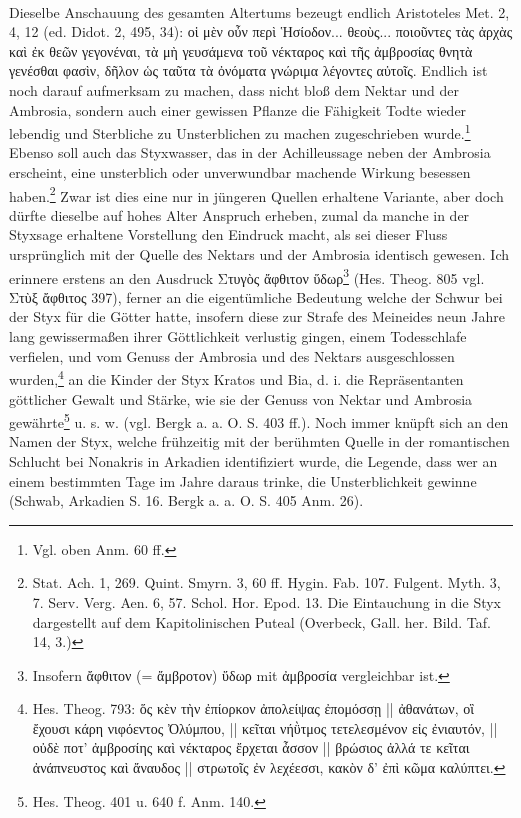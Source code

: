 \documentclass[a4paper, 11pt, oneside]{article}
\begin{document}
\paragraph{}
Dieselbe Anschauung des gesamten Altertums bezeugt endlich Aristoteles Met. 2, 4, 12 (ed. Didot. 2, 495, 34): οἱ μὲν οὖν περὶ Ἡσίοδον... θεοὺς... ποιοῦντες τὰς ἀρχὰς καὶ ἐκ θεῶν γεγονέναι, τὰ μὴ γευσάμενα τοῦ νέκταρος καὶ τῆς ἀμβροσίας θνητὰ γενέσθαι φασὶν, δῆλον ὡς ταῦτα τὰ ὀνόματα γνώριμα λέγοντες αὐτοῖς. Endlich ist noch darauf aufmerksam zu machen, dass nicht bloß dem Nektar und der Ambrosia, sondern auch einer gewissen Pflanze die Fähigkeit Todte wieder lebendig und Sterbliche zu Unsterblichen zu machen zugeschrieben wurde.\footnote{Vgl. oben Anm. 60 ff.} Ebenso soll auch das Styxwasser, das in der Achilleussage neben der Ambrosia erscheint, eine unsterblich oder unverwundbar machende Wirkung besessen haben.\footnote{Stat. Ach. 1, 269. Quint. Smyrn. 3, 60 ff. Hygin. Fab. 107. Fulgent. Myth. 3, 7. Serv. Verg. Aen. 6, 57. Schol. Hor. Epod. 13. Die Eintauchung in die Styx dargestellt auf dem Kapitolinischen Puteal (Overbeck, Gall. her. Bild. Taf. 14, 3.)} Zwar ist dies eine nur in jüngeren Quellen erhaltene Variante, aber doch dürfte dieselbe auf hohes Alter Anspruch erheben, zumal da manche in der Styxsage erhaltene Vorstellung den Eindruck macht, als sei dieser Fluss ursprünglich mit der Quelle des Nektars und der Ambrosia identisch gewesen. Ich erinnere erstens an den Ausdruck Στυγὸς ἄφθιτον ὕδωρ\footnote{Insofern ἄφθιτον (= ἄμβροτον) ὕδωρ mit ἀμβροσία vergleichbar ist.} (Hes. Theog. 805 vgl. Στὺξ ἄφθιτος 397), ferner an die eigentümliche Bedeutung welche der Schwur bei der Styx für die Götter hatte, insofern diese zur Strafe des Meineides neun Jahre lang gewissermaßen ihrer Göttlichkeit verlustig gingen, einem Todesschlafe verfielen, und vom Genuss der Ambrosia und des Nektars ausgeschlossen wurden,\footnote{Hes. Theog. 793: ὅς κὲν τὴν ἐπίορκον ἀπολείψας ἐπομόσσῃ || ἀθανάτων, οἳ ἔχουσι κάρη νιφόεντος Ὀλύμπου, || κεῖται νήῢτμος τετελεσμένον εἰς ἐνιαυτόν, || οὐδὲ ποτ' ἀμβροσίης καὶ νέκταρος ἔρχεται ἆσσον || βρώσιος ἀλλά τε κεῖται ἀνάπνευστος καὶ ἄναυδος || στρωτοῖς ἐν λεχέεσσι, κακὸν δ' ἐπὶ κῶμα καλύπτει.} an die Kinder der Styx Kratos und Bia, d. i. die Repräsentanten göttlicher Gewalt und Stärke, wie sie der Genuss von Nektar und Ambrosia gewährte\footnote{Hes. Theog. 401 u. 640 f. Anm. 140.} u. s. w. (vgl. Bergk a. a. O. S. 403 ff.). Noch immer knüpft sich an den Namen der Styx, welche frühzeitig mit der berühmten Quelle in der romantischen Schlucht bei Nonakris in Arkadien identifiziert wurde, die Legende, dass wer an einem bestimmten Tage im Jahre daraus trinke, die Unsterblichkeit gewinne (Schwab, Arkadien S. 16. Bergk a. a. O. S. 405 Anm. 26).
\end{document}
